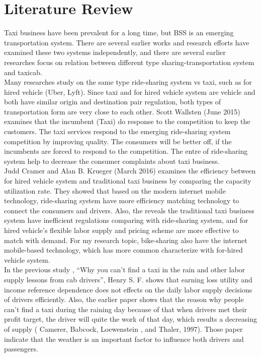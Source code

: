 \documentclass{article}
\begin{document}
	\section{Literature Review}
    Taxi business have been prevalent for a long time, but BSS is an emerging transportation system. There are several earlier works and research efforts have examined these two systems independently, and there are several earlier researches focus on relation between different type sharing-transportation system and taxicab.\\
    Many researches study on the same type ride-sharing system vs taxi, such as for hired vehicle (Uber, Lyft). Since taxi and for hired vehicle system are vehicle and both have similar origin and destination pair regulation, both types of transportation form are very close to each other. Scott Wallsten (June 2015)\citep{wallsten2015competitive} examines that the incumbent (Taxi) do response to the competition to keep the customers. The taxi services respond to the emerging ride-sharing system competition by improving quality. The consumers will be better off, if the incumbents are forced to respond to the competition. The entre of ride-sharing system help to decrease the consumer complaints about taxi business. \\
    Judd Cramer and Alan B. Krueger (March 2016)\citep{cramer2016disruptive} examines the efficiency between for hired vehicle system and traditional taxi business by comparing the capacity utilization rate. They showed that based on the modern internet mobile technology, ride-sharing system have more efficiency matching technology to connect the consumers and drivers. Also, the reveals the traditional taxi business system have inefficient regulations comparing with ride-sharing system, and for hired vehicle’s flexible labor supply and pricing scheme are more effective to match with demand. For my research topic, bike-sharing also have the internet mobile-based technology, which has more common characterize with for-hired vehicle system. \\
    In the previous study , “Why you can’t find a taxi in the rain and other labor supply lessons from cab drivers”, Henry S. F. shows that earning loss utility and income reference dependence does not effects on the daily labor supply decisions of drivers efficiently. Also, the earlier paper shows that the reason why people can’t find a taxi during the raining day because of that when drivers met their profit target, the driver will quite the work of that day, which results a decreasing of supply ( Camerer, Babcock, Loewenstein , and Thaler, 1997).\citep{camerer1997labor} Those paper indicate that the weather is an important factor to influence both drivers and passengers.\\
\end{document}
